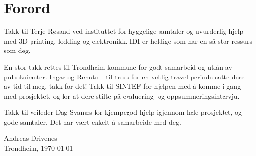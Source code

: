 \chapter*{Forord}
Takk til Terje Røsand ved instituttet for hyggelige samtaler og uvurderlig hjelp med 3D-printing, lodding og elektronikk.
IDI er heldige som har en så stor ressurs som deg.

En stor takk rettes til Trondheim kommune for godt samarbeid og utlån av pulsoksimeter.
Ingar og Renate -- til tross for en veldig travel periode satte dere av tid til meg, takk for det!
Takk til SINTEF for hjelpen med å komme i gang med prosjektet, og for at dere
stilte på evaluering- og oppsummeringsintervju.

Takk til veileder Dag Svanæs for kjempegod hjelp igjennom hele prosjektet, og gode samtaler.
Det har vært enkelt å samarbeide med deg.

\begin{flushright}
Andreas Drivenes\\[0.8pc]
Trondheim, \today
\end{flushright}
\thispagestyle{empty}

\clearpage
